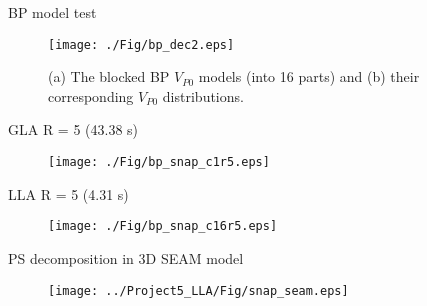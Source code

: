 \documentclass[aspectratio=169]{beamer}
\begin{document}
\begin{frame}{BP model test}
  \begin{figure}
  \texttt{[image: ./Fig/bp\_dec2.eps]}
  \caption {
(a) The blocked BP $V_{P0}$ models (into 16 parts) and (b) their corresponding $V_{P0}$ distributions.
}
  \end{figure}
\end{frame}
\begin{frame}{GLA R = 5 (43.38 s)}
   \begin{figure}[ht]
   \texttt{[image: ./Fig/bp\_snap\_c1r5.eps]}
   \end{figure}
\end{frame}
\begin{frame}{LLA R = 5 (4.31 s)}
   \begin{figure}[ht]
   \texttt{[image: ./Fig/bp\_snap\_c16r5.eps]}
   \end{figure}
\end{frame}
\begin{frame}{PS decomposition in 3D SEAM model}
   \begin{figure}[ht]
   \texttt{[image: ../Project5\_LLA/Fig/snap\_seam.eps]}
   \end{figure}
\end{frame}
\end{document}
